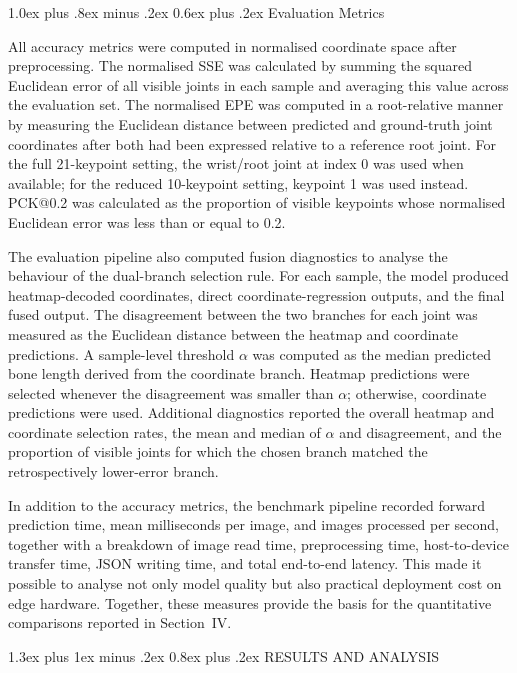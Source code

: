 \documentclass[10pt,letterpaper,twocolumn]{article}
\makeatletter
\renewcommand\section{\@startsection{section}{1}{\z@}%
  {1.3ex plus 1ex minus .2ex}%
  {0.8ex plus .2ex}%
  {\centering\normalfont\small\scshape}}
\renewcommand\subsection{\@startsection{subsection}{2}{\z@}%
  {1.0ex plus .8ex minus .2ex}%
  {0.6ex plus .2ex}%
  {\normalfont\itshape}}
\makeatother
\begin{document}
\subsection{Evaluation Metrics}

All accuracy metrics were computed in normalised coordinate space after preprocessing. The normalised SSE was calculated by summing the squared Euclidean error of all visible joints in each sample and averaging this value across the evaluation set. The normalised EPE was computed in a root-relative manner by measuring the Euclidean distance between predicted and ground-truth joint coordinates after both had been expressed relative to a reference root joint. For the full 21-keypoint setting, the wrist/root joint at index 0 was used when available; for the reduced 10-keypoint setting, keypoint 1 was used instead. PCK@0.2 was calculated as the proportion of visible keypoints whose normalised Euclidean error was less than or equal to 0.2.

The evaluation pipeline also computed fusion diagnostics to analyse the behaviour of the dual-branch selection rule. For each sample, the model produced heatmap-decoded coordinates, direct coordinate-regression outputs, and the final fused output. The disagreement between the two branches for each joint was measured as the Euclidean distance between the heatmap and coordinate predictions. A sample-level threshold $\alpha$ was computed as the median predicted bone length derived from the coordinate branch. Heatmap predictions were selected whenever the disagreement was smaller than $\alpha$; otherwise, coordinate predictions were used. Additional diagnostics reported the overall heatmap and coordinate selection rates, the mean and median of $\alpha$ and disagreement, and the proportion of visible joints for which the chosen branch matched the retrospectively lower-error branch.

In addition to the accuracy metrics, the benchmark pipeline recorded forward prediction time, mean milliseconds per image, and images processed per second, together with a breakdown of image read time, preprocessing time, host-to-device transfer time, JSON writing time, and total end-to-end latency. This made it possible to analyse not only model quality but also practical deployment cost on edge hardware. Together, these measures provide the basis for the quantitative comparisons reported in Section~IV.

\section{RESULTS AND ANALYSIS}
\end{document}
